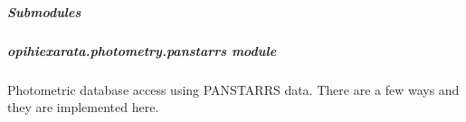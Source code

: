 \documentclass[letterpaper,11pt,english]{sphinxmanual}
\begin{document}
\subparagraph{Submodules}
\label{\detokenize{code/opihiexarata.photometry:submodules}}
\sphinxstepscope


\subparagraph{opihiexarata.photometry.panstarrs module}
\label{\detokenize{code/opihiexarata.photometry.panstarrs:module-opihiexarata.photometry.panstarrs}}\label{\detokenize{code/opihiexarata.photometry.panstarrs:opihiexarata-photometry-panstarrs-module}}\label{\detokenize{code/opihiexarata.photometry.panstarrs::doc}}
\sphinxAtStartPar
Photometric database access using PANSTARRS data. There are a few ways and
they are implemented here.
\end{document}
